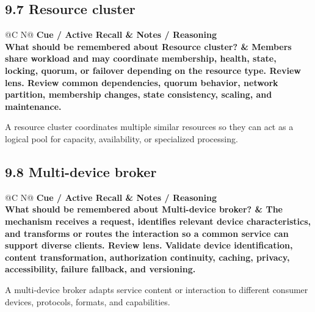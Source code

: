 \documentclass[11pt]{article}
\newcommand{\CornellHeader}{\rowcolor{Navy}\color{white}\bfseries Cue / Active Recall & \color{white}\bfseries Notes / Reasoning \\\endhead}
\newcommand{\CornellRow}[2]{\cellcolor{CueGray}\textbf{#1} & #2 \\\addlinespace[3pt]}
\begin{document}
\subsection{9.7 Resource cluster}
\begin{longtable}{@{}C N@{}}
\CornellHeader
\CornellRow{What should be remembered about Resource cluster?}{Members share workload and may coordinate membership, health, state, locking, quorum, or failover depending on the resource type. \textbf{Review lens.} Review common dependencies, quorum behavior, network partition, membership changes, state consistency, scaling, and maintenance.}
\end{longtable}
\begin{sectionsummarybox}
A resource cluster coordinates multiple similar resources so they can act as a logical pool for capacity, availability, or specialized processing.
\end{sectionsummarybox}
\subsection{9.8 Multi-device broker}
\begin{longtable}{@{}C N@{}}
\CornellHeader
\CornellRow{What should be remembered about Multi-device broker?}{The mechanism receives a request, identifies relevant device characteristics, and transforms or routes the interaction so a common service can support diverse clients. \textbf{Review lens.} Validate device identification, content transformation, authorization continuity, caching, privacy, accessibility, failure fallback, and versioning.}
\end{longtable}
\begin{sectionsummarybox}
A multi-device broker adapts service content or interaction to different consumer devices, protocols, formats, and capabilities.
\end{sectionsummarybox}
\end{document}
